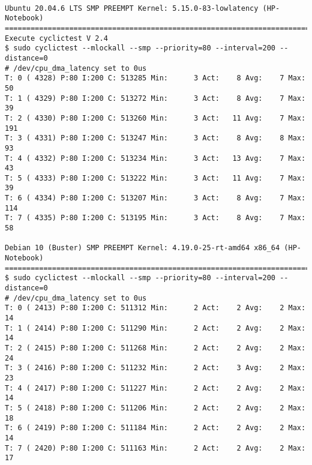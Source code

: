 \clearpage
\pagebreak
\begin{landscape}
	
\begin{lstlisting}[caption={App Realtime Latency Test for HP-Notebook}, label=App Realtime Latency Test for HP-Notebook]	

Ubuntu 20.04.6 LTS SMP PREEMPT Kernel: 5.15.0-83-lowlatency (HP-Notebook)
================================================================================
Execute cyclictest V 2.4
$ sudo cyclictest --mlockall --smp --priority=80 --interval=200 --distance=0
# /dev/cpu_dma_latency set to 0us
T: 0 ( 4328) P:80 I:200 C: 513285 Min:      3 Act:    8 Avg:    7 Max:      50
T: 1 ( 4329) P:80 I:200 C: 513272 Min:      3 Act:    8 Avg:    7 Max:      39
T: 2 ( 4330) P:80 I:200 C: 513260 Min:      3 Act:   11 Avg:    7 Max:     191
T: 3 ( 4331) P:80 I:200 C: 513247 Min:      3 Act:    8 Avg:    8 Max:      93
T: 4 ( 4332) P:80 I:200 C: 513234 Min:      3 Act:   13 Avg:    7 Max:      43
T: 5 ( 4333) P:80 I:200 C: 513222 Min:      3 Act:   11 Avg:    7 Max:      39
T: 6 ( 4334) P:80 I:200 C: 513207 Min:      3 Act:    8 Avg:    7 Max:     114
T: 7 ( 4335) P:80 I:200 C: 513195 Min:      3 Act:    8 Avg:    7 Max:      58

Debian 10 (Buster) SMP PREEMPT Kernel: 4.19.0-25-rt-amd64 x86_64 (HP-Notebook)
================================================================================
$ sudo cyclictest --mlockall --smp --priority=80 --interval=200 --distance=0
# /dev/cpu_dma_latency set to 0us
T: 0 ( 2413) P:80 I:200 C: 511312 Min:      2 Act:    2 Avg:    2 Max:      14
T: 1 ( 2414) P:80 I:200 C: 511290 Min:      2 Act:    2 Avg:    2 Max:      14
T: 2 ( 2415) P:80 I:200 C: 511268 Min:      2 Act:    2 Avg:    2 Max:      24
T: 3 ( 2416) P:80 I:200 C: 511232 Min:      2 Act:    3 Avg:    2 Max:      23
T: 4 ( 2417) P:80 I:200 C: 511227 Min:      2 Act:    2 Avg:    2 Max:      14
T: 5 ( 2418) P:80 I:200 C: 511206 Min:      2 Act:    2 Avg:    2 Max:      18
T: 6 ( 2419) P:80 I:200 C: 511184 Min:      2 Act:    2 Avg:    2 Max:      14
T: 7 ( 2420) P:80 I:200 C: 511163 Min:      2 Act:    2 Avg:    2 Max:      17
\end{lstlisting}

\end{landscape}

